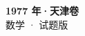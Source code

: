 \documentclass[zihao=-4, a4paper]{ctexart}
\begin{document}
\begin{center}
  {\Large\bfseries 1977 年·天津卷}\\[4pt]
  {\large 数学 · 试题版}
\end{center}
\medskip
{}

\end{document}
